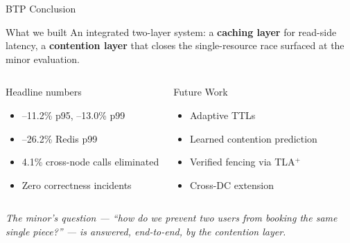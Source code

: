 \documentclass[aspectratio=169,xcolor=dvipsnames,9pt]{beamer}
\begin{document}
\begin{frame}{BTP Conclusion}
\begin{block}{What we built}
  \footnotesize
  An integrated two-layer system: a \textbf{caching layer} for read-side latency, a \textbf{contention layer} that closes the single-resource race surfaced at the minor evaluation.
\end{block}
\begin{columns}[T]
  \begin{exampleblock}{Headline numbers}
    \footnotesize
    \begin{itemize}
      \item --11.2\% p95, --13.0\% p99
      \item --26.2\% Redis p99
      \item 4.1\% cross-node calls eliminated
      \item Zero correctness incidents
    \end{itemize}
  \end{exampleblock}
  \begin{alertblock}{Future Work}
    \footnotesize
    \begin{itemize}
      \item Adaptive TTLs
      \item Learned contention prediction
      \item Verified fencing via TLA$^+$
      \item Cross-DC extension
    \end{itemize}
  \end{alertblock}
\end{columns}
\centering
\vspace{0.3em}
\footnotesize\itshape
The minor's question --- ``how do we prevent two users from booking the same single piece?'' --- is answered, end-to-end, by the contention layer.
\end{frame}

\end{document}
